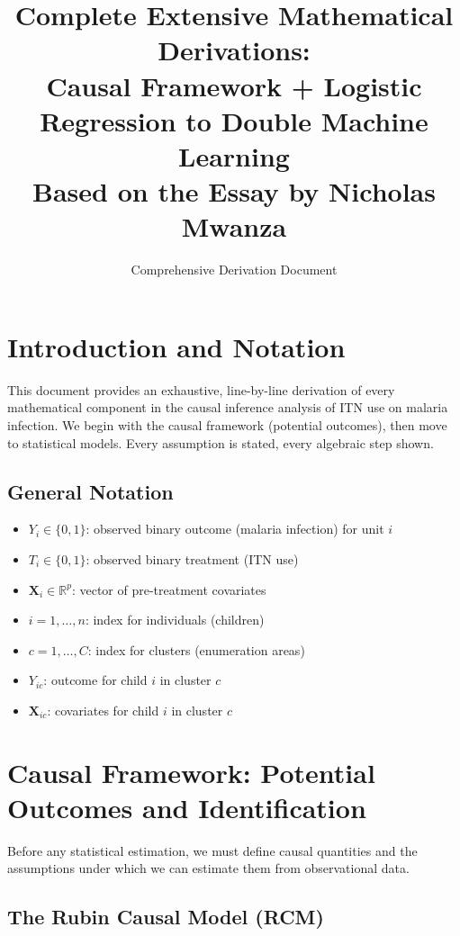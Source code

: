 \documentclass[12pt]{article}
\title{Complete Extensive Mathematical Derivations: \\
	Causal Framework + Logistic Regression to Double Machine Learning \\
	\large Based on the Essay by Nicholas Mwanza}
\author{Comprehensive Derivation Document}
\date{}
\numberwithin{equation}{section}
\begin{document}
	
	\maketitle
	\tableofcontents
	
	\section{Introduction and Notation}
	
	This document provides an exhaustive, line-by-line derivation of every mathematical component in the causal inference analysis of ITN use on malaria infection. We begin with the causal framework (potential outcomes), then move to statistical models. Every assumption is stated, every algebraic step shown.
	
	\subsection{General Notation}
	\begin{itemize}
		\item $Y_i \in \{0,1\}$: observed binary outcome (malaria infection) for unit $i$
		\item $T_i \in \{0,1\}$: observed binary treatment (ITN use)
		\item $\mathbf{X}_i \in \mathbb{R}^p$: vector of pre-treatment covariates
		\item $i = 1, \dots, n$: index for individuals (children)
		\item $c = 1, \dots, C$: index for clusters (enumeration areas)
		\item $Y_{ic}$: outcome for child $i$ in cluster $c$
		\item $\mathbf{X}_{ic}$: covariates for child $i$ in cluster $c$
	\end{itemize}
	
	\section{Causal Framework: Potential Outcomes and Identification}
	
	Before any statistical estimation, we must define causal quantities and the assumptions under which we can estimate them from observational data.
	
	\subsection{The Rubin Causal Model (RCM)}
	
\end{document}
